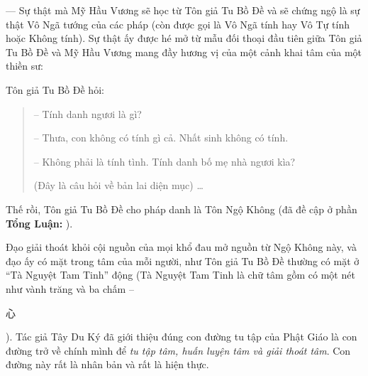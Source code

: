 --- Sự thật mà Mỹ Hầu Vương sẽ học từ Tôn giả Tu Bồ Đề và sẽ chứng ngộ là sự thật Vô Ngã tướng của các pháp (còn được gọi là Vô Ngã tính hay Vô Tự tính hoặc Không tính). Sự thật ấy được hé mở từ mẫu đối thoại đầu tiên giữa Tôn giả Tu Bồ Đề và Mỹ Hầu Vương mang đầy hương vị của một cảnh khai tâm của một thiền sư:

Tôn giả Tu Bồ Đề hỏi:

\begin{quote}
-- Tính danh ngươi là gì?

-- Thưa, con không có tính gì cả. Nhất sinh không có tính.

-- Không phải là tính tình. Tính danh bố mẹ nhà ngươi kìa?

(Đây là câu hỏi về bản lai diện mục) \ldots
\end{quote}

Thế rồi, Tôn giả Tu Bồ Đề cho pháp danh là Tôn Ngộ Không (đã đề cập ở phần {\bf Tổng Luận:} ).

Đạo giải thoát khỏi cội nguồn của mọi khổ đau mở nguồn từ Ngộ Không này, và đạo ấy có mặt trong tâm của mỗi người, như Tôn giả Tu Bồ Đề thường có mặt ở ``Tà Nguyệt Tam Tinh'' động (Tà Nguyệt Tam Tinh là chữ tâm gồm có một nét như vành trăng và ba chấm -- \begin{CJK*}{UTF8}{bkai}心\end{CJK*}). Tác giả Tây Du Ký đã giới thiệu đúng con đường tu tập của Phật Giáo là con đường trở về chính mình để \emph{tu tập tâm, huấn luyện tâm và giải thoát tâm}. Con đường này rất là nhân bản và rất là hiện thực.

\hrulefill


